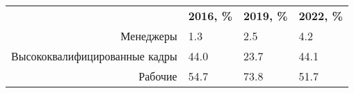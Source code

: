 \documentclass{article}
\begin{document}
\begin{minipage}{\textwidth}
\centering
\begin{tabularx}{0.8\textwidth}{rYYY}
\toprule
 & \textbf{2016, \%} & \textbf{2019, \%} & \textbf{2022, \%} \\
\cmidrule(lr){2-2}\cmidrule(lr){3-3}\cmidrule(lr){4-4}
Менеджеры & 1.3 & 2.5 & 4.2 \\

Высококвалифицированные кадры & 44.0 & 23.7 & 44.1 \\

Рабочие & 54.7 & 73.8 & 51.7 \\
\bottomrule
\end{tabularx}
\label{task3}
\end{minipage} \\[35pt]
\end{document}
